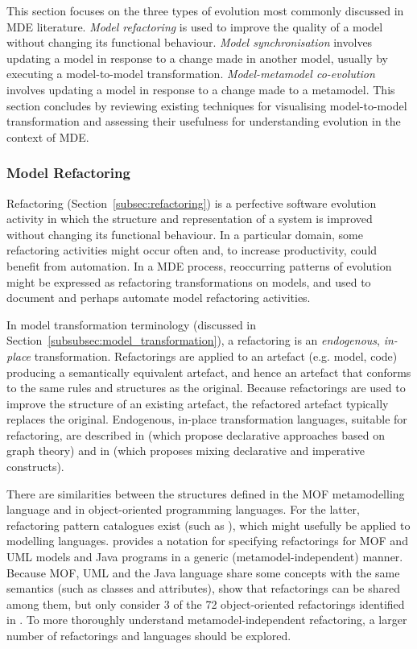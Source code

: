 This section focuses on the three types of evolution most commonly discussed in MDE literature. \emph{Model refactoring} is used to improve the quality of a model without changing its functional behaviour. \emph{Model synchronisation} involves updating a model in response to a change made in another model, usually by executing a model-to-model transformation. \emph{Model-metamodel co-evolution} involves updating a model in response to a change made to a metamodel. This section concludes by reviewing existing techniques for visualising model-to-model transformation and assessing their usefulness for understanding evolution in the context of MDE. 

\subsubsection{Model Refactoring}
Refactoring (Section~\ref{subsec:refactoring}) is a perfective software evolution activity in which the structure and representation of a system is improved without changing its functional behaviour. In a particular domain, some refactoring activities might occur often and, to increase productivity, could benefit from automation. In a MDE process, reoccurring patterns of evolution might be expressed as  refactoring transformations on models, and used to document and perhaps automate model refactoring activities. 

In model transformation terminology (discussed in Section~\ref{subsubsec:model_transformation}), a refactoring is an \emph{endogenous}, \emph{in-place} transformation. Refactorings are applied to an artefact (e.g. model, code) producing a semantically equivalent artefact, and hence an artefact that conforms to the same rules and structures as the original. Because refactorings are used to improve the structure of an existing artefact, the refactored artefact typically replaces the original. Endogenous, in-place transformation languages, suitable for refactoring, are described in \cite{biermann06refactoring,porres03refactoring} (which propose declarative approaches based on graph theory) and in \cite{kolovos07ewl} (which proposes mixing declarative and imperative constructs).

There are similarities between the structures defined in the MOF metamodelling language and in object-oriented programming languages. For the latter, refactoring pattern catalogues exist (such as \cite{fowler99refactoring}), which might usefully be applied to modelling languages. \cite{moha09refactoring} provides a notation for specifying refactorings for MOF and UML models and Java programs in a generic (metamodel-independent) manner. Because MOF, UML and the Java language share some concepts with the same semantics (such as classes and attributes), \cite{moha09refactoring} show that refactorings can be shared among them, but only consider 3 of the 72 object-oriented refactorings identified in \cite{fowler99refactoring}. To more thoroughly understand metamodel-independent refactoring, a larger number of refactorings and languages should be explored.

